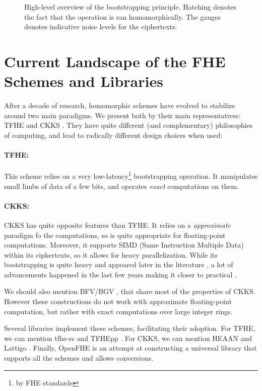 \begin{figure}
	\centering
	
	\caption{High-level overview of the bootstrapping principle. Hatching denotes the fact that the operation is ran homomorphically. The gauges denotes indicative noise levels for the ciphertexts.}
	\label{fig:bootstrapping_principle}
\end{figure}


\section{Current Landscape of the FHE Schemes and Libraries}
\label{sec:landscape}

After a decade of research, homomorphic schemes have evolved to stabilize around two main paradigms. We present both by their main representatives: TFHE \cite{JC:CGGI20} and CKKS \cite{AC:CKKS17}. They have quite different (and complementary) philosophies of computing, and lead to radically different design choices when used:


\paragraph{TFHE:} This scheme relies on a very low-latency\footnote{by FHE standards} bootstrapping operation. It manipulates small limbs of data of a few bits, and operates \textit{exact} computations on them.


\paragraph{CKKS:} CKKS has quite opposite features than TFHE. It relies on a \textit{approximate} paradigm fo the computations, so is quite appropriate for floating-point computations. Moreover, it supports SIMD (Same Instruction Multiple Data) within its ciphertexts, so it allows for heavy parallelization. While its bootstrapping is quite heavy and appeared later in the literature \cite{EC:CHKKS18}, a lot of advancements happened in the last few years making it closer to practical \cite{EC:CheChiSon19, RSA:HanKi20, AC:KPKKM22}.


We should also mention BFV/BGV \cite{C:Brakerski12, bgv, EPRINT:FanVer12}, that share most of the properties of CKKS. However these constructions do not work with approximate floating-point computation, but rather with exact computations over large integer rings.


Several libraries implement these schemes, facilitating their adoption. For TFHE, we can mention tfhe-rs \cite{tfhe-rs}  and TFHEpp \cite{TFHEpp}. For CKKS, we can mention HEAAN \cite{heaan} and Lattigo \cite{lattigo}. Finally, OpenFHE \cite{OpenFHE} is an attempt at constructing a universal library that supports all the schemes and allows conversions.


